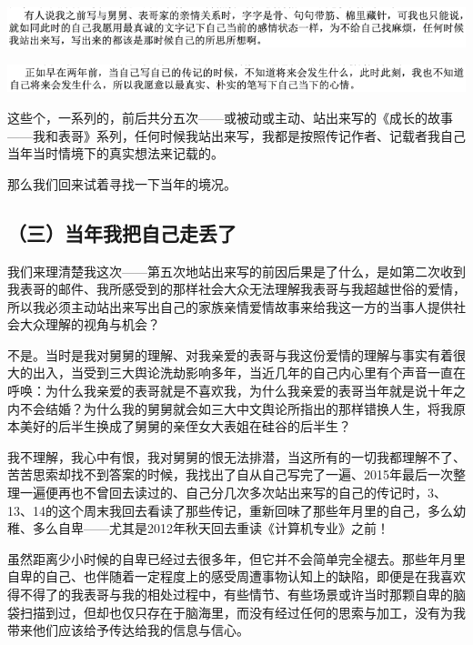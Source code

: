 \documentclass[9pt, b5paper]{article}
\begin{document}
\begin{center}
\includegraphics[width=.9\linewidth]{./pic/backups_plans_20210426_114722.png}
\end{center}

\begin{center}
\includegraphics[width=.9\linewidth]{./pic/backups_plans_20210426_114834.png}
\end{center}

这些个，一系列的，前后共分五次——或被动或主动、站出来写的《成长的故事——我和表哥》系列，任何时候我站出来写，我都是按照传记作者、记载者我自己当年当时情境下的真实想法来记载的。

那么我们回来试着寻找一下当年的境况。

\subsection{（三）当年我把自己走丢了}
\label{sec:orgfec35d3}

我们来理清楚我这次——第五次地站出来写的前因后果是了什么，是如第二次收到我表哥的邮件、我所感受到的那样社会大众无法理解我表哥与我超越世俗的爱情，所以我必须主动站出来写出自己的家族亲情爱情故事来给我这一方的当事人提供社会大众理解的视角与机会？

不是。当时是我对舅舅的理解、对我亲爱的表哥与我这份爱情的理解与事实有着很大的出入，当受到三大舆论洗劫影响多年，当近几年的自己内心里有个声音一直在呼唤：为什么我亲爱的表哥就是不喜欢我，为什么我亲爱的表哥当年就是说十年之内不会结婚？为什么我的舅舅就会如三大中文舆论所指出的那样错换人生，将我原本美好的后半生换成了舅舅的亲侄女大表姐在硅谷的后半生？

我不理解，我心中有恨，我对舅舅的恨无法排潜，当这所有的一切我都理解不了、苦苦思索却找不到答案的时候，我找出了自从自己写完了一遍、2015年最后一次整理一遍便再也不曾回去读过的、自己分几次多次站出来写的自己的传记时，3、13、14的这个周末我回去看读了那些传记，重新回味了那些年月里的自己，多么幼稚、多么自卑——尤其是2012年秋天回去重读《计算机专业》之前！

虽然距离少小时候的自卑已经过去很多年，但它并不会简单完全褪去。那些年月里自卑的自己、也伴随着一定程度上的感受周遭事物认知上的缺陷，即便是在我喜欢得不得了的我表哥与我的相处过程中，有些情节、有些场景或许当时那颗自卑的脑袋扫描到过，但却也仅只存在于脑海里，而没有经过任何的思索与加工，没有为我带来他们应该给予传达给我的信息与信心。
\end{document}
